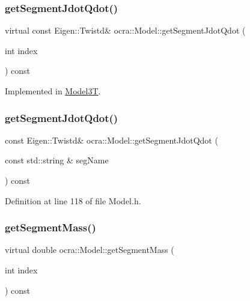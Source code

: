 \subsubsection{\texorpdfstring{get\+Segment\+Jdot\+Qdot()}{getSegmentJdotQdot()}\hspace{0.1cm}{\footnotesize\ttfamily [1/2]}}
{\footnotesize\ttfamily virtual const Eigen\+::\+Twistd\& ocra\+::\+Model\+::get\+Segment\+Jdot\+Qdot (\begin{DoxyParamCaption}\item[{int}]{index }\end{DoxyParamCaption}) const\hspace{0.3cm}{\ttfamily [pure virtual]}}



Implemented in \hyperlink{classModel3T_add0fcd2f4259009f964a03c6402d1ca9}{Model3T}.

\hypertarget{classocra_1_1Model_ac388cdc62947904aa0347a8c77d3d9d5}{}\label{classocra_1_1Model_ac388cdc62947904aa0347a8c77d3d9d5} 
\subsubsection{\texorpdfstring{get\+Segment\+Jdot\+Qdot()}{getSegmentJdotQdot()}\hspace{0.1cm}{\footnotesize\ttfamily [2/2]}}
{\footnotesize\ttfamily const Eigen\+::\+Twistd\& ocra\+::\+Model\+::get\+Segment\+Jdot\+Qdot (\begin{DoxyParamCaption}\item[{const std\+::string \&}]{seg\+Name }\end{DoxyParamCaption}) const\hspace{0.3cm}{\ttfamily [inline]}}



Definition at line 118 of file Model.\+h.

\hypertarget{classocra_1_1Model_a9840649a6137c8ec964914f91c83a1b9}{}\label{classocra_1_1Model_a9840649a6137c8ec964914f91c83a1b9} 
\subsubsection{\texorpdfstring{get\+Segment\+Mass()}{getSegmentMass()}\hspace{0.1cm}{\footnotesize\ttfamily [1/2]}}
{\footnotesize\ttfamily virtual double ocra\+::\+Model\+::get\+Segment\+Mass (\begin{DoxyParamCaption}\item[{int}]{index }\end{DoxyParamCaption}) const\hspace{0.3cm}{\ttfamily [pure virtual]}}



